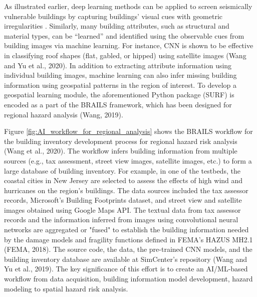 As illustrated earlier, deep learning methods can be applied to screen seismically vulnerable buildings by capturing buildings' visual cues with geometric irregularities \citep{yu2020largescale}. Similarly, many building attributes, such as structural and material types, can be ``learned'' and identified using the observable cues from building images via machine learning. For instance, CNN is shown to be effective in classifying roof shapes (flat, gabled, or hipped) using satellite images (Wang and Yu et al., 2020). In addition to extracting attribute information using individual building images, machine learning can also infer missing building information using geospatial patterns in the region of interest. To develop a geospatial learning module, the aforementioned Python package (SURF) is encoded as a part of the BRAILS framework, which has been designed for regional hazard analysis (Wang, 2019). 

Figure \ref{fig:AI_workflow_for_regional_analysis} shows the BRAILS workflow for the building inventory development process for regional hazard risk analysis (Wang et al., 2020). The workflow infers building information from multiple sources (e.g., tax assessment, street view images, satellite images, etc.) to form a large database of building inventory. For example, in one of the testbeds, the coastal cities in New Jersey are selected to assess the effects of high wind and hurricanes on the region's buildings. The data sources included the tax assessor records, Microsoft's Building Footprints dataset, and street view and satellite images obtained using Google Maps API. The textual data from tax assessor records and the information inferred from images using convolutional neural networks are aggregated or "fused" to establish the building information needed by the damage models and fragility functions defined in FEMA's HAZUS MH2.1 (FEMA, 2018). The source code, the data, the pre-trained CNN models, and the building inventory database are available at SimCenter's repository (Wang and Yu et al., 2019). The key significance of this effort is to create an AI/ML-based workflow from data acquisition, building information model development, hazard modeling to spatial hazard risk analysis. 

